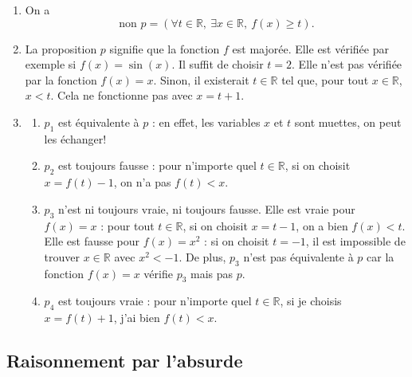 \documentclass[11pt,a4paper]{article}
\begin{document}
	\begin{corrige}
		\begin{enumerate}
			
			\item  On a 
			$$\textrm{non }p=(\forall t\in\mathbb R,\ \exists x\in\mathbb R,\ f(x)\geq t).$$
			
			\item  La proposition $p$ signifie que la fonction $f$ est majorée. Elle est vérifiée par exemple si $f(x)=\sin(x)$. Il suffit de choisir $t=2$. Elle n'est pas vérifiée par la fonction $f(x)=x$.
			Sinon, il existerait $t\in\mathbb R$ tel que, pour tout $x\in\mathbb R$, $x<t$. Cela ne fonctionne pas avec $x=t+1$.
			
			\item  
			
			\begin{enumerate}
				
				\item  $p_1$ est équivalente à $p$ : en effet, les variables $x$ et $t$ sont muettes, on peut les échanger!
				
				\item  $p_2$ est toujours fausse : pour n'importe quel $t\in\mathbb R$, si on choisit $x=f(t)-1$, on n'a pas $f(t)<x$.
				
				\item  $p_3$ n'est ni toujours vraie, ni toujours fausse. Elle est vraie pour $f(x)=x$ : pour tout $t\in\mathbb R$, si on choisit $x=t-1$, on a bien $f(x)<t$. 
				Elle est fausse pour $f(x)=x^2$ : si on choisit $t=-1$, il est impossible de trouver $x\in\mathbb R$ avec $x^2< -1$. De plus, $p_3$ n'est pas équivalente à $p$ car la fonction $f(x)=x$ vérifie $p_3$ mais pas $p$.
				
				\item  $p_4$ est toujours vraie : pour n'importe quel $t\in\mathbb R$, si je choisis $x=f(t)+1$, j'ai bien $f(t)<x$.
				
			\end{enumerate}
			
			
		\end{enumerate}
	\end{corrige}
	
	\subsection*{Raisonnement par l'absurde}
	
\end{document}
